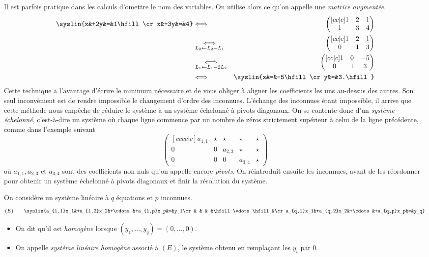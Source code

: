 \documentclass{magnoliaold}
\begin{document}
\begin{remarques}
\remarque Il est parfois pratique dans les calculs d'omettre le nom des variables. On
  utilise alors ce qu'on appelle une \emph{matrice augmentée}.
\begin{eqnarray*}
\syslin{x&+2y&=&1\hfill\cr
            x&+3y&=&4}
&\ssi& \begin{pmatrix}[cc|c]
  1 & 2 & 1\\
  1 & 3 & 4
\end{pmatrix}\\
&\underset{L_2\gets L_2-L_1}{\ssi}& \begin{pmatrix}[cc|c]
  1 & 2 & 1\\
  0 & 1 & 3 
\end{pmatrix}
\\
&\underset{L_1\gets L_1-2L_2}{\ssi}& \begin{pmatrix}[cc|c]
  1 & 0 & -5\\
  0 & 1 & 3 
\end{pmatrix}
\\
&\ssi& \syslin{x&=&-5\hfill\cr
        y&=&3.\hfill}
\end{eqnarray*}
Cette technique a l'avantage d'écrire le minimum nécessaire et de vous obliger à aligner
les coefficients les uns au-dessus des autres. Son seul inconvénient est de rendre
impossible le changement d'ordre des inconnues.
\remarque L'échange des inconnues étant impossible, il arrive que cette méthode nous 
  empêche de réduire le système à un système échelonné à pivots diagonaux.
  On se contente donc d'un \emph{système échelonné}, c'est-à-dire
  un système où chaque ligne commence par un nombre de zéros strictement supérieur à
  celui de la ligne précédente, comme dans l'exemple suivant
  \[\begin{pmatrix}[cccc|c]
    a_{1,1} & \star &   \star &   \star & \star \\
          0 &     0 & a_{2,3} &   \star & \star \\
          0 &     0 &       0  & a_{3,4} & \star
  \end{pmatrix}\]
  où $a_{1,1}, a_{2,3}$ et $a_{3,4}$ sont des coefficients non nuls qu'on appelle encore
  \emph{pivots}.
  On réintroduit ensuite les inconnues, avant de les réordonner
  pour obtenir un système échelonné à pivots diagonaux et finir la résolution
  du système.
\end{remarques}

\begin{definition}
On considère un système linéaire à $q$ équations et $p$ inconnues.
\[(E) \qquad \syslin{a_{1,1}x_1&+a_{1,2}x_2&+\cdots&+a_{1,p}x_p&=&y_1\cr
                    &          &       &          &\hfill\vdots\hfill&\cr
          a_{q,1}x_1&+a_{q,2}x_2&+\cdots&+a_{q,p}x_p&=&y_q}\]
\begin{itemize}
\item On dit qu'il est \emph{homogène} lorsque $(y_1,\ldots,y_q)=(0,\ldots,0)$.
\item On appelle \emph{système linéaire homogène} associé à $(E)$, le système obtenu en
  remplaçant les $y_i$ par $0$.
\end{itemize}
\end{definition}
\end{document}
